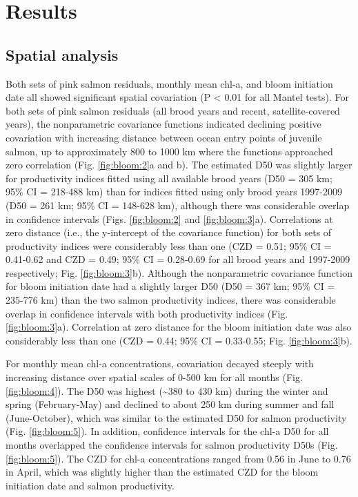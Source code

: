 \section{Results}

\subsection{Spatial analysis}

Both sets of pink salmon residuals, monthly mean chl-a, and bloom initiation
date all showed significant spatial covariation (P \textless{} 0.01 for all
Mantel tests). For both sets of pink salmon residuals (all brood years and
recent, satellite-covered years), the nonparametric covariance functions
indicated declining positive covariation with increasing distance between ocean
entry points of juvenile salmon, up to approximately 800 to 1000 km where the
functions approached zero correlation (Fig. \ref{fig:bloom:2}a and b). The estimated D50 was
slightly larger for productivity indices fitted using all available brood years
(D50 = 305 km; 95\% CI = 218-488 km) than for indices fitted using only brood
years 1997-2009 (D50 = 261 km; 95\% CI = 148-628 km), although there was
considerable overlap in confidence intervals (Figs. \ref{fig:bloom:2} and
\ref{fig:bloom:3}a). Correlations at
zero distance (i.e., the y-intercept of the covariance function) for both sets
of productivity indices were considerably less than one (CZD = 0.51; 95\% CI =
0.41-0.62 and CZD = 0.49; 95\% CI = 0.28-0.69 for all brood years and 1997-2009
respectively; Fig. \ref{fig:bloom:3}b). Although the nonparametric covariance function for bloom
initiation date had a slightly larger D50 (D50 = 367 km; 95\% CI = 235-776 km)
than the two salmon productivity indices, there was considerable overlap in
confidence intervals with both productivity indices (Fig. \ref{fig:bloom:3}a). Correlation at
zero distance for the bloom initiation date was also considerably less than one
(CZD = 0.44; 95\% CI = 0.33-0.55; Fig. \ref{fig:bloom:3}b).

For monthly mean chl-a concentrations, covariation decayed steeply with
increasing distance over spatial scales of 0-500 km for all months (Fig.
\ref{fig:bloom:4}).
The D50 was highest (\textasciitilde{}380 to 430 km) during the winter and
spring (February-May) and declined to about 250 km during summer and fall
(June-October), which was similar to the estimated D50 for salmon productivity
(Fig. \ref{fig:bloom:5}). In addition, confidence intervals for the chl-a D50 for all months
overlapped the confidence intervals for salmon productivity D50s (Fig.
\ref{fig:bloom:5}). The
CZD for chl-a concentrations ranged from 0.56 in June to 0.76 in April, which
was slightly higher than the estimated CZD for the bloom initiation date and
salmon productivity.


